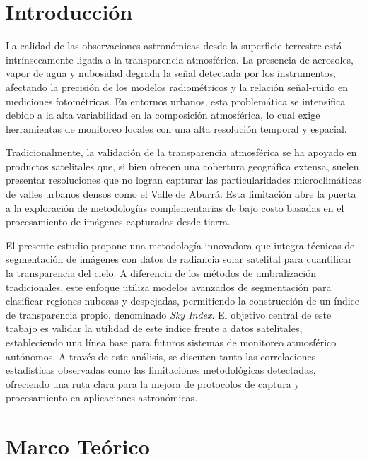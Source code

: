 \documentclass[twocolumn]{aastex701}
\begin{document}

\section{Introducción} \label{sec:intro}
La calidad de las observaciones astronómicas desde la superficie terrestre está intrínsecamente ligada a la transparencia atmosférica. La presencia de aerosoles, vapor de agua y nubosidad degrada la señal detectada por los instrumentos, afectando la precisión de los modelos radiométricos y la relación señal-ruido en mediciones fotométricas. En entornos urbanos, esta problemática se intensifica debido a la alta variabilidad en la composición atmosférica, lo cual exige herramientas de monitoreo locales con una alta resolución temporal y espacial.

Tradicionalmente, la validación de la transparencia atmosférica se ha apoyado en productos satelitales que, si bien ofrecen una cobertura geográfica extensa, suelen presentar resoluciones que no logran capturar las particularidades microclimáticas de valles urbanos densos como el Valle de Aburrá. Esta limitación abre la puerta a la exploración de metodologías complementarias de bajo costo basadas en el procesamiento de imágenes capturadas desde tierra.

El presente estudio propone una metodología innovadora que integra técnicas de segmentación de imágenes con datos de radiancia solar satelital para cuantificar la transparencia del cielo. A diferencia de los métodos de umbralización tradicionales, este enfoque utiliza modelos avanzados de segmentación para clasificar regiones nubosas y despejadas, permitiendo la construcción de un índice de transparencia propio, denominado \textit{Sky Index}. El objetivo central de este trabajo es validar la utilidad de este índice frente a datos satelitales, estableciendo una línea base para futuros sistemas de monitoreo atmosférico autónomos. A través de este análisis, se discuten tanto las correlaciones estadísticas observadas como las limitaciones metodológicas detectadas, ofreciendo una ruta clara para la mejora de protocolos de captura y procesamiento en aplicaciones astronómicas.

\section{Marco Teórico} \label{sec:theory}
\end{document}
